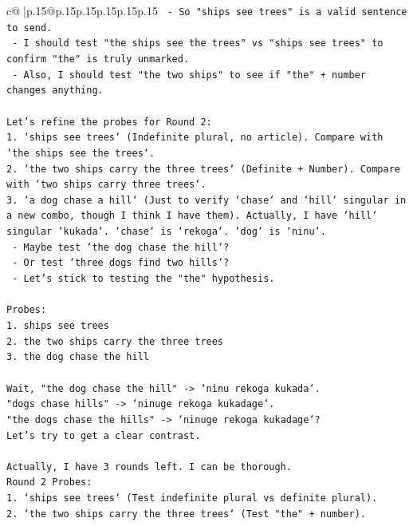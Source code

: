 \documentclass{article}
\begin{document}
{\begin{supertabular}{c@{$\;$}|p{.15\linewidth}@{}p{.15\linewidth}p{.15\linewidth}p{.15\linewidth}p{.15\linewidth}p{.15\linewidth}}
{{{\texttt{  {-} So "ships see trees" is a valid sentence to send.} \\
\texttt{  {-} I should test "the ships see the trees" vs "ships see trees" to confirm "the" is truly unmarked.} \\
\texttt{  {-} Also, I should test "the two ships" to see if "the" + number changes anything.} \\
\\ 
\texttt{Let's refine the probes for Round 2:} \\
\texttt{1. `ships see trees` (Indefinite plural, no article). Compare with `the ships see the trees`.} \\
\texttt{2. `the two ships carry the three trees` (Definite + Number). Compare with `two ships carry three trees`.} \\
\texttt{3. `a dog chase a hill` (Just to verify `chase` and `hill` singular in a new combo, though I think I have them). Actually, I have `hill` singular `kukada`. `chase` is `rekoga`. `dog` is `ninu`.} \\
\texttt{   {-} Maybe test `the dog chase the hill`?} \\
\texttt{   {-} Or test `three dogs find two hills`?} \\
\texttt{   {-} Let's stick to testing the "the" hypothesis.} \\
\\ 
\texttt{Probes:} \\
\texttt{1. ships see trees} \\
\texttt{2. the two ships carry the three trees} \\
\texttt{3. the dog chase the hill} \\
\\ 
\texttt{Wait, "the dog chase the hill" {-}> `ninu rekoga kukada`.} \\
\texttt{"dogs chase hills" {-}> `ninuge rekoga kukadage`.} \\
\texttt{"the dogs chase the hills" {-}> `ninuge rekoga kukadage`?} \\
\texttt{Let's try to get a clear contrast.} \\
\\ 
\texttt{Actually, I have 3 rounds left. I can be thorough.} \\
\texttt{Round 2 Probes:} \\
\texttt{1. `ships see trees` (Test indefinite plural vs definite plural).} \\
\texttt{2. `the two ships carry the three trees` (Test "the" + number).} \\
}}}
\end{supertabular}}
\end{document}
